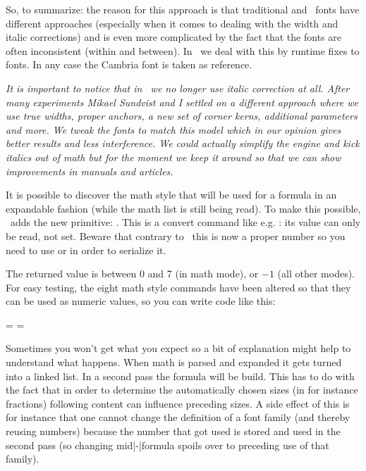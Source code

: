 So, to summarize: the reason for this approach is that traditional and \OPENTYPE\
fonts have different approaches (especially when it comes to dealing with the
width and italic corrections) and is even more complicated by the fact that the
fonts are often inconsistent (within and between). In \CONTEXT\ we deal with this
by runtime fixes to fonts. In any case the Cambria font is taken as reference.

{\em It is important to notice that in \CONTEXT\ we no longer use italic
correction at all. After many experiments Mikael Sundvist and I settled on a
different approach where we use true widths, proper anchors, a new set of corner
kerns, additional parameters and more. We tweak the fonts to match this model
which in our opinion gives better results and less interference. We could
actually simplify the engine and kick italics out of math but for the moment we
keep it around so that we can show improvements in manuals and articles.}

\stopsection

\startsection[title={Math styles}]

It is possible to discover the math style that will be used for a formula in an
expandable fashion (while the math list is still being read). To make this
possible, \LUATEX\ adds the new primitive: \typ {\mathstyle}. This is a \quote
{convert command} like e.g. \typ {\romannumeral}: its value can only be read,
not set. Beware that contrary to \LUATEX\ this is now a proper number so you need
to use \type {\number} or \type {\the} in order to serialize it.

The returned value is between 0 and 7 (in math mode), or $-1$ (all other modes).
For easy testing, the eight math style commands have been altered so that they can
be used as numeric values, so you can write code like this:

\starttyping
\ifnum\mathstyle=\textstyle
\else \ifnum\mathstyle=\crampedtextstyle
\fi \fi
\stoptyping

Sometimes you won't get what you expect so a bit of explanation might help to
understand what happens. When math is parsed and expanded it gets turned into a
linked list. In a second pass the formula will be build. This has to do with the
fact that in order to determine the automatically chosen sizes (in for instance
fractions) following content can influence preceding sizes. A side effect of this
is for instance that one cannot change the definition of a font family (and
thereby reusing numbers) because the number that got used is stored and used in
the second pass (so changing \type {\fam 12} mid|-|formula spoils over to
preceding use of that family).


